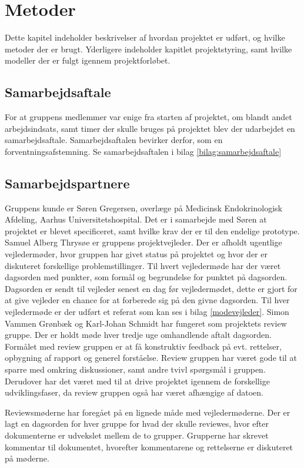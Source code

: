 \chapter{Metoder}
Dette kapitel indeholder beskrivelser af hvordan projektet er udført, og hvilke metoder der er brugt. Yderligere indeholder kapitlet projektstyring, samt hvilke modeller der er fulgt igennem projektforløbet. 

\section{Samarbejdsaftale}
For at gruppens medlemmer var enige fra starten af projektet, om blandt andet arbejdsindsats, samt timer der skulle bruges på projektet blev der udarbejdet en samarbejdsaftale. Samarbejdsaftalen bevirker derfor, som en forventningsafstemning. Se samarbejdsaftalen i bilag \ref{bilag:samarbejdsaftale}

\section{Samarbejdspartnere}
Gruppens kunde er Søren Gregersen, overlæge på Medicinsk Endokrinologisk Afdeling, Aarhus Universitetshospital. Det er i samarbejde med Søren at projektet er blevet specificeret, samt hvilke krav der er til den endelige prototype.
Samuel Alberg Thrysøe er gruppens projektvejleder. Der er afholdt ugentlige vejledermøder, hvor gruppen har givet status på projektet og hvor der er diskuteret forskellige problemstillinger. Til hvert vejledermøde har der været dagsorden med punkter, som formål og begrundelse for punktet på dagsorden. Dagsorden er sendt til vejleder senest en dag før vejledermødet, dette er gjort for at give vejleder en chance for at forberede sig på den givne dagsorden. Til hver vejledermøde er der udført et referat som kan ses i bilag \ref{modevejleder}.
Simon Vammen Grønbæk og Karl-Johan Schmidt har fungeret som projektets review gruppe. Der er holdt møde hver tredje uge omhandlende aftalt dagsorden. Formålet med review gruppen er at få konstruktiv feedback på evt. rettelser, opbygning af rapport og generel forståelse. Review gruppen har været gode til at sparre med omkring diskussioner, samt andre tvivl spørgsmål i gruppen. Derudover har det været med til at drive projektet igennem de forskellige udviklingsfaser, da review gruppen også har været afhængige af datoen.

Reviewsmøderne har foregået på en lignede måde med vejledermøderne. Der er lagt en dagsorden for hver gruppe for hvad der skulle reviewes, hvor efter dokumenterne er udvekslet mellem de to grupper. Grupperne har skrevet kommentar til dokumentet, hvorefter kommentarene og rettelserne er diskuteret på møderne. 

